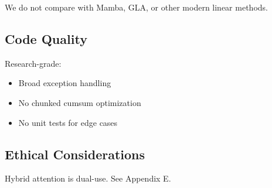 We do not compare with Mamba, GLA, or other modern linear methods.

\subsection{Code Quality}

Research-grade:
\begin{itemize}
\item Broad exception handling
\item No chunked cumsum optimization
\item No unit tests for edge cases

\end{itemize}
\subsection{Ethical Considerations}

Hybrid attention is dual-use. See Appendix E.

